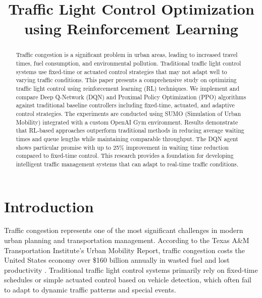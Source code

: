 \documentclass[conference]{IEEEtran}
\begin{document}
\title{Traffic Light Control Optimization using Reinforcement Learning}

\author{
}

\maketitle

\begin{abstract}
Traffic congestion is a significant problem in urban areas, leading to increased travel times, fuel consumption, and environmental pollution. Traditional traffic light control systems use fixed-time or actuated control strategies that may not adapt well to varying traffic conditions. This paper presents a comprehensive study on optimizing traffic light control using reinforcement learning (RL) techniques. We implement and compare Deep Q-Network (DQN) and Proximal Policy Optimization (PPO) algorithms against traditional baseline controllers including fixed-time, actuated, and adaptive control strategies. The experiments are conducted using SUMO (Simulation of Urban Mobility) integrated with a custom OpenAI Gym environment. Results demonstrate that RL-based approaches outperform traditional methods in reducing average waiting times and queue lengths while maintaining comparable throughput. The DQN agent shows particular promise with up to 25\% improvement in waiting time reduction compared to fixed-time control. This research provides a foundation for developing intelligent traffic management systems that can adapt to real-time traffic conditions.
\end{abstract}

\section{Introduction}
\label{sec:introduction}

Traffic congestion represents one of the most significant challenges in modern urban planning and transportation management. According to the Texas A\&M Transportation Institute's Urban Mobility Report, traffic congestion costs the United States economy over \$160 billion annually in wasted fuel and lost productivity \cite{tti2021}. Traditional traffic light control systems primarily rely on fixed-time schedules or simple actuated control based on vehicle detection, which often fail to adapt to dynamic traffic patterns and special events.
\end{document}
